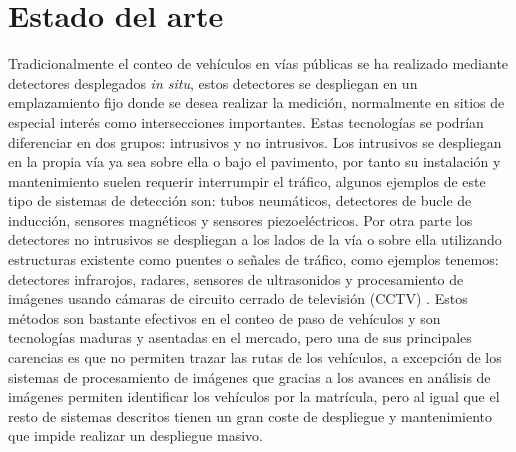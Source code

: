 \documentclass[../proyecto.tex]{subfiles}
\begin{document}
\section{Estado del arte}

Tradicionalmente el conteo de vehículos en vías públicas se ha realizado mediante detectores desplegados \textit{in situ}, estos detectores se despliegan en un emplazamiento fijo donde se desea realizar la medición, normalmente en sitios de especial interés como intersecciones importantes. Estas tecnologías se podrían diferenciar en dos grupos: intrusivos y no intrusivos. Los intrusivos se despliegan en la propia vía ya sea sobre ella o bajo el pavimento, por tanto su instalación y mantenimiento suelen requerir interrumpir el tráfico, algunos ejemplos de este tipo de sistemas de detección son: tubos neumáticos, detectores de bucle de inducción, sensores magnéticos y sensores piezoeléctricos. Por otra parte los detectores no intrusivos se despliegan a los lados de la vía o sobre ella utilizando estructuras existente como puentes o señales de tráfico, como ejemplos tenemos: detectores infrarojos, radares, sensores de ultrasonidos y  procesamiento de imágenes usando cámaras de circuito cerrado de televisión (CCTV) \cite{MIMBELA20078}. Estos métodos son bastante efectivos en el conteo de paso de vehículos \cite{CZYZEWSKI20196} y son tecnologías maduras y asentadas en el mercado, pero una de sus principales carencias es que no permiten trazar las rutas de los vehículos, a excepción de los sistemas de procesamiento de imágenes que gracias a los avances en análisis de imágenes permiten identificar los vehículos por la matrícula, pero al igual que el resto de sistemas descritos tienen un gran coste de despliegue y mantenimiento que impide realizar un despliegue masivo.\\
\end{document}
